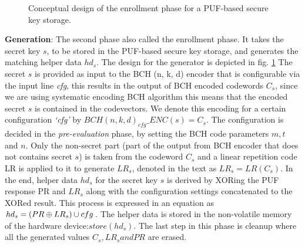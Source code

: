 \begin{figure}[htp]
\centering
{}
\caption{Conceptual design of the enrollment phase for a PUF-based secure key storage.}
\label{img:fz_2}
\end{figure}

\textbf{Generation}: The second phase also called the enrollment phase. It takes the secret key $s$, to be stored in the PUF-based secure key storage, and generates the matching helper data $hd_s$. The design for the generator is depicted in fig. \ref{img:fz_2}  The secret $s$ is provided as input to the BCH (n, k, d) encoder that is configurable via the input line \emph{cfg}, this results in the output of BCH encoded codewords $C_s$, since we are using systematic encoding BCH algorithm this means that
the encoded secret $s$ is contained in the codevectors. We denote this encoding for a certain configuration \emph{`cfg'} by $BCH(n,k,d)_{cfg}\_ENC(s) = C_s$. The configuration is decided in the \emph{pre-evaluation} phase, by setting the BCH code parameters $m, t$ and $n$.
Only the non-secret part (part of the output from BCH encoder that does not contains secret $s$) is taken from the codeword $C_s$ and a linear repetition code LR is applied to it to generate $LR_s$, denoted in the text as $LR_s = LR(C_s)$. In the end, helper data $hd_s$ for the secret key $s$ is derived by XORing the PUF response PR and $LR_s$ along with the configuration settings concatenated to the XORed result. This process is expressed in an equation as $hd_s = (PR \mathbin{\oplus} LR_s) \cup cfg$.
The helper data is stored in the non-volatile memory of the hardware device:$store(hd_s)$. The last step in this phase is cleanup where all the generated values $C_s, LR_s and PR$ are erased.\\

